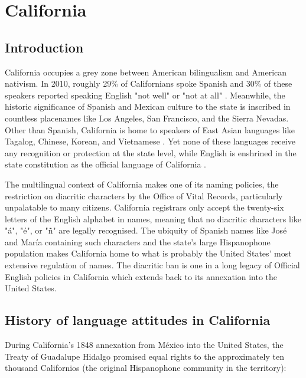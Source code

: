 \section{California}

\subsection{Introduction}

California occupies a grey zone between American bilingualism and American
nativism. In 2010, roughly 29\% of Californians spoke Spanish and 30\% of these
speakers reported speaking English "not well" or "not at all"
\parencite{acs-lang-states}. Meanwhile, the historic significance of Spanish
and Mexican culture to the state is inscribed in countless placenames like Los
Angeles, San Francisco, and the Sierra Nevadas. Other than Spanish, California
is home to speakers of East Asian languages like Tagalog, Chinese, Korean, and
Vietnamese \parencite{acs-lang-states}. Yet none of these languages receive any
recognition or protection at the state level, while English is enshrined in the
state constitution as the official language of California \parencite{ca-const}.

The multilingual context of California makes one of its naming policies, the
restriction on diacritic characters by the Office of Vital Records,
particularly unpalatable to many citizens. California registrars only accept
the twenty-six letters of the English alphabet in names, meaning that no
diacritic characters like "á", "é", or "ñ" are legally recognised. The ubiquity
of Spanish names like José and María containing such characters and the state's
large Hispanophone population makes California home to what is probably the
United States' most extensive regulation of names. The diacritic ban is one in
a long legacy of Official English policies in California which extends back to
its annexation into the United States.

\subsection{History of language attitudes in California}

During California's 1848 annexation from México into the United States, the
Treaty of Guadalupe Hidalgo promised equal rights to the approximately ten
thousand Californios (the original Hispanophone community in the territory):


